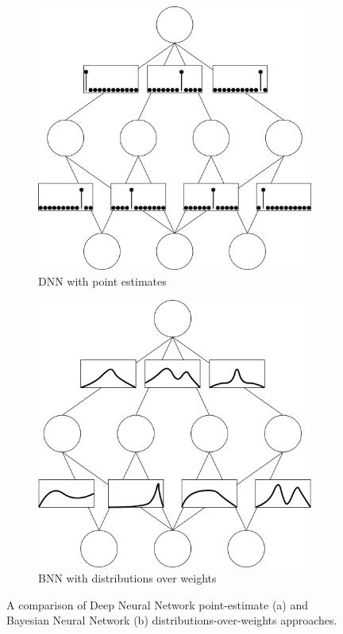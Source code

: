 \begin{figure}[h]
     \centering
     \begin{subfigure}[b]{0.45\textwidth}
         \centering
         \includegraphics[width=\textwidth]{methods/img/DNN.drawio.png}
         \caption{DNN with point estimates} \label{fig:bnn-dnn-point-estimate}
     \end{subfigure} 
     \hfill
     \begin{subfigure}[b]{0.45\textwidth}
          \includegraphics[width=\textwidth]{methods/img/BNN.drawio.png}
         \caption{BNN with distributions over weights} \label{fig:bnn-distribution-estimate}
     \end{subfigure} 
     \caption[Comparison of DNN and BNN approaches]{A comparison of Deep Neural Network point-estimate (a) and Bayesian Neural Network (b) distributions-over-weights approaches.}
    \label{fig:bnn-dnn-approaches}
\end{figure}


